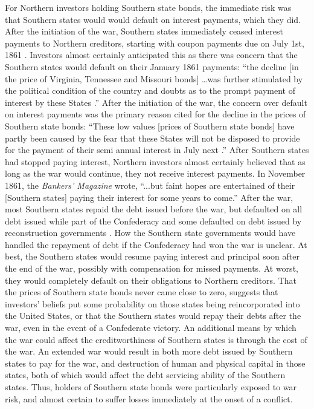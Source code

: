 \documentclass[]{article}\usepackage[]{graphicx}\usepackage[]{color}
\begin{document}
For Northern investors holding Southern state bonds, the immediate risk was that Southern states would would default on interest payments, which they did.
After the initiation of the war, Southern states immediately ceased interest payments to Northern creditors, starting with coupon payments due on July 1st, 1861 \parencites[947]{BankersMagazine1860}[159]{BankersMagazine1862}.
Investors almost certainly anticipated this as there was concern that the Southern states would default on their January 1861 payments: ``the decline [in the price of Virginia, Tennessee and Missouri bonds] \dots was further stimulated by the political condition of the country and doubts as to the prompt payment of interest by these States \parencite[756]{BankersMagazine1860}.''
After the initiation of the war, the concern over default on interest payments was the primary reason cited for the decline in the prices of Southern state bonds: ``These low values [prices of Southern state bonds] have partly been caused by the fear that these States will not be disposed to provide for the payment of their semi annual interest in July next \parencite[947]{BankersMagazine1860}.''
After Southern states had stopped paying interest, Northern investors almost certainly believed that as long as the war would continue, they not receive interest payments.
In November 1861, the \textit{Bankers' Magazine} wrote, ``...but faint hopes are entertained of their [Southern states] paying their interest for some years to come.'' \parencite[559]{BankersMagazine1862}
After the war, most Southern states repaid the debt issued before the war, but defaulted on all debt issued while part of the Confederacy and some defaulted on debt issued by reconstruction governments \parencites{Randolph1931}{Ratchford1941}.
How the Southern state governments would have handled the repayment of debt if the Confederacy had won the war is unclear.
At best, the Southern states would resume paying interest and principal soon after the end of the war, possibly with compensation for missed payments.
At worst, they would completely default on their obligations to Northern creditors.
That the prices of Southern state bonds never came close to zero, suggests that investors' beliefs put some probability on those states being reincorporated into the United States, or that the Southern states would repay their debts after the war, even in the event of a Confederate victory.
An additional means by which the war could affect the creditworthiness of Southern states is through the cost of the war.
An extended war would result in both more debt issued by Southern states to pay for the war, and destruction of human and physical capital in those states, both of which would affect the debt servicing ability of the Southern states.
Thus, holders of Southern state bonds were particularly exposed to war risk, and almost certain to suffer losses immediately at the onset of a conflict.
\end{document}
